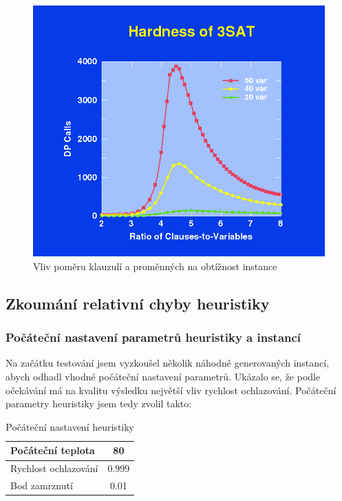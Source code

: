\documentclass[11pt]{article}
\begin{document}
\begin{figure}[h!]
	\centering
	\includegraphics[width=\textwidth]{att.png}
	\caption{Vliv poměru klauzulí a proměnných na obtížnost instance\cite{selman}}
	\label{fig:att}
\end{figure}

\newpage

\subsection{Zkoumání relativní chyby heuristiky}
\label{sec:rel_error}

\subsubsection{Počáteční nastavení parametrů heuristiky a instancí}

Na začátku testování jsem vyzkoušel několik náhodně generovaných instancí, abych odhadl vhodné počáteční nastavení parametrů. Ukázalo se, že podle očekávání má na kvalitu výsledku největší vliv rychlost ochlazování. Počáteční parametry heuristiky jsem tedy zvolil takto:

\begin{table}[h!]
	\centering
	\begin{tabular}{| l | c | }
	\hline
	Počáteční teplota & 80  \\ \hline
	Rychlost ochlazování & 0.999  \\ \hline
        Bod zamrznutí & 0.01  \\
	\hline
	\end{tabular}
	\caption{Počáteční nastavení heuristiky}
	\label{tab:params1}
\end{table}
\end{document}
